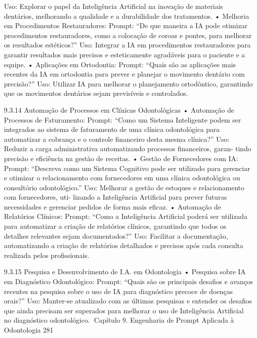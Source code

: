       Uso: Explorar o papel da Inteligência Artificial na inovação de materiais dentários,
      melhorando a qualidade e a durabilidade dos tratamentos.
    • Melhoria em Procedimentos Restauradores:
      Prompt: “De que maneira a IA pode otimizar procedimentos restauradores, como
      a colocação de coroas e pontes, para melhorar os resultados estéticos?”
      Uso: Integrar a IA em procedimentos restauradores para garantir resultados mais
      precisos e esteticamente agradáveis para o paciente e a equipe.
    • Aplicações em Ortodontia:
      Prompt: “Quais são as aplicações mais recentes da IA em ortodontia para prever
      e planejar o movimento dentário com precisão?”
      Uso: Utilizar IA para melhorar o planejamento ortodôntico, garantindo que os
      movimentos dentários sejam previsíveis e controlados.

9.3.14     Automação de Processos em Clínicas Odontológicas
    • Automação de Processos de Faturamento:
      Prompt: “Como um Sistema Inteligente podem ser integrados ao sistema de
      faturamento de uma clínica odontológica para automatizar a cobrança e o controle
      financeiro desta mesma clínica?”
      Uso: Reduzir a carga administrativa automatizando processos financeiros, garan-
      tindo precisão e eficiência na gestão de receitas.
    • Gestão de Fornecedores com IA:
      Prompt: “Descreva como um Sistema Cognitivo pode ser utilizado para gerenciar
      e otimizar o relacionamento com fornecedores em uma clínica odontológica ou
      consultório odontológico.”
      Uso: Melhorar a gestão de estoques e relacionamento com fornecedores, uti-
      lizando a Inteligência Artificial para prever futuras necessidades e gerenciar
      pedidos de forma mais eficaz.
    • Automação de Relatórios Clínicos:
      Prompt: “Como a Inteligência Artificial poderá ser utilizada para automatizar a
      criação de relatórios clínicos, garantindo que todos os detalhes relevantes sejam
      documentados?”
      Uso: Facilitar a documentação, automatizando a criação de relatórios detalhados
      e precisos após cada consulta realizada pelos profissionais.

9.3.15     Pesquisa e Desenvolvimento de I.A. em Odontologia
    • Pesquisa sobre IA em Diagnóstico Odontológico:
      Prompt: “Quais são os principais desafios e avanços recentes na pesquisa sobre
      o uso de IA para diagnóstico precoce de doenças orais?”
      Uso: Manter-se atualizado com as últimas pesquisas e entender os desafios que
      ainda precisam ser superados para melhorar o uso de Inteligência Artificial no
      diagnóstico odontológico.
Capítulo 9. Engenharia de Prompt Aplicada à Odontologia                           281


